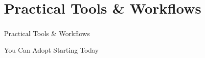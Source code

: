 \section[Tools]{Practical Tools \& Workflows}
\begin{frame}[fragile]\frametitle{}
\begin{center}
{\Large Practical Tools \& Workflows}

{\small You Can Adopt Starting Today}
\end{center}
\end{frame}

%
%

